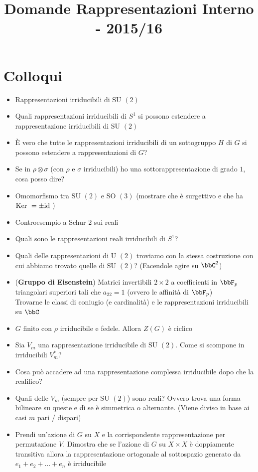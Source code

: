 \documentclass[a4paper,NoNotes,GeneralMath]{stdmdoc}
\newcommand{\SU}{\text{SU }}
\newcommand{\SO}{\text{SO }}
\newcommand{\U}{\text{U }}
\begin{document}
	\title{Domande Rappresentazioni Interno - 2015/16}

	\section*{Colloqui}
	\begin{itemize}
		\item Rappresentazioni irriducibili di $\SU(2)$
		\item Quali rappresentazioni irriducibili di $S^1$ si possono estendere a rappresentazione irriducibili di $\SU(2)$
		\item È vero che tutte le rappresentazioni irriducibili di un sottogruppo $H$ di $G$ si possono estendere a rappresentazioni di $G$?
		\item Se in $\rho \otimes \sigma$ (con $\rho$ e $\sigma$ irriducibili) ho una sottorappresentazione di grado $1$, cosa posso dire?
		\item Omomorfismo tra $\SU(2)$ e $\SO(3)$ (mostrare che è surgettivo e che ha $\mbox{Ker } = \pm \mbox{id}$ )
		\item Controesempio a Schur $2$ sui reali
		\item Quali sono le rappresentazioni reali irriducibili di $S^1$?
		\item Quali delle rappresentazioni di $\U(2)$ troviamo con la stessa costruzione con cui abbiamo trovato quelle di $\SU(2)$? (Facendole agire su $\bbC^2$)
		\item ({\bf Gruppo di Eisenstein}) Matrici invertibili $2\times 2$ a coefficienti in $\bbF_p$ triangolari superiori tali che $a_{22} = 1$ (ovvero le affinità di $\bbF_p$) \\
			Trovarne le classi di coniugio (e cardinalità) e le rappresentazioni irriducibili su $\bbC$
		\item $G$ finito con $\rho$ irriducibile e fedele. Allora $Z(G)$ è ciclico
		\item Sia $V_m$ una rappresentazione irriducibile di $\SU(2)$. Come si scompone in irriducibili $V_m^*$?
		\item Cosa può accadere ad una rappresentazione complessa irriducibile dopo che la realifico?
		\item Quali delle $V_m$ (sempre per $\SU(2)$) sono reali? Ovvero trova una forma bilineare su queste e dì se è simmetrica o alternante. (Viene diviso in base ai casi $m$ pari / dispari)
		\item Prendi un'azione di $G$ su $X$ e la corrispondente rappresentazione per permutazione $V$. Dimostra che se l'azione di $G$ su $X\times X$ è doppiamente transitiva allora la rappresentazione ortogonale al sottospazio generato da ${e_1 + e_2 + \ldots + e_n}$ è irriducibile

\end{itemize}
\end{document}
